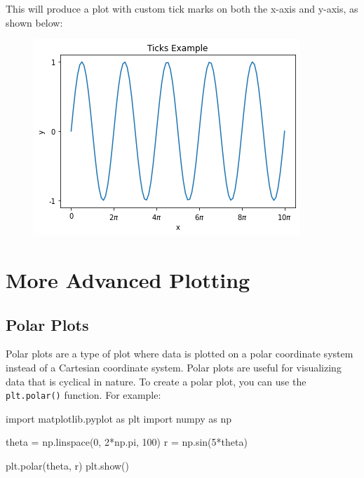 \documentclass[11pt]{article}
\newenvironment{Shaded}{}{}
\newcommand{\DecValTok}[1]{\textcolor[rgb]{0.25,0.63,0.44}{{#1}}}
\newcommand{\NormalTok}[1]{{#1}}
\newcommand{\ImportTok}[1]{{#1}}
\newcommand{\OperatorTok}[1]{\textcolor[rgb]{0.40,0.40,0.40}{{#1}}}
\begin{document}
This will produce a plot with custom tick marks on both the x-axis and
y-axis, as shown below: 
\begin{figure}
  \centering
  \includegraphics[scale=0.6]{ticks.png}
\end{figure}

\hypertarget{more-advanced-plotting}{%
\section{More Advanced Plotting}\label{more-advanced-plotting}}

\hypertarget{polar-plots}{%
\subsection{Polar Plots}\label{polar-plots}}

Polar plots are a type of plot where data is plotted on a polar
coordinate system instead of a Cartesian coordinate system. Polar plots
are useful for visualizing data that is cyclical in nature. To create a
polar plot, you can use the \texttt{plt.polar()} function. For example:

\begin{Shaded}
\begin{Highlighting}[]
\ImportTok{import}\NormalTok{ matplotlib.pyplot }\ImportTok{as}\NormalTok{ plt}
\ImportTok{import}\NormalTok{ numpy }\ImportTok{as}\NormalTok{ np}

\NormalTok{theta }\OperatorTok{=}\NormalTok{ np.linspace(}\DecValTok{0}\NormalTok{, }\DecValTok{2}\OperatorTok{*}\NormalTok{np.pi, }\DecValTok{100}\NormalTok{)}
\NormalTok{r }\OperatorTok{=}\NormalTok{ np.sin(}\DecValTok{5}\OperatorTok{*}\NormalTok{theta)}

\NormalTok{plt.polar(theta, r)}
\NormalTok{plt.show()}
\end{Highlighting}
\end{Shaded}
\end{document}

